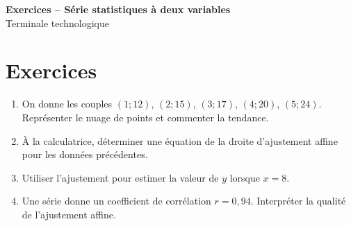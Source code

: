 \documentclass[french,11pt]{book}
\begin{document}
\begin{center}
{\Large \textbf{Exercices -- Série statistiques à deux variables}}\\[2mm]
Terminale technologique
\end{center}

\section*{Exercices}
\begin{enumerate}
  \item On donne les couples $(1;12)$, $(2;15)$, $(3;17)$, $(4;20)$, $(5;24)$. Représenter le nuage de points et commenter la tendance.
  \item À la calculatrice, déterminer une équation de la droite d'ajustement affine pour les données précédentes.
  \item Utiliser l'ajustement pour estimer la valeur de $y$ lorsque $x=8$.
  \item Une série donne un coefficient de corrélation $r=0,94$. Interpréter la qualité de l'ajustement affine.
\end{enumerate}
\end{document}
